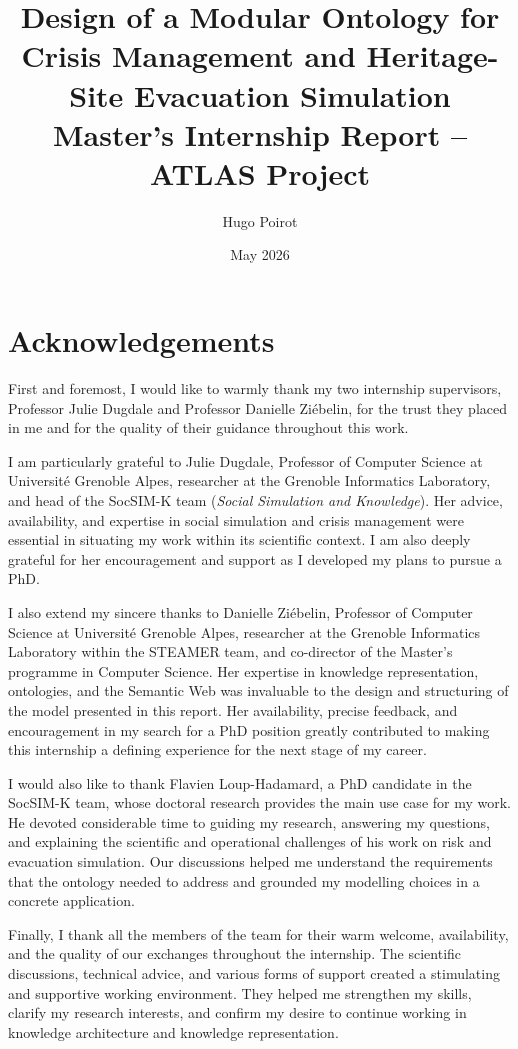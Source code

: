 \documentclass{article}
\title{Design of a Modular Ontology for Crisis Management and Heritage-Site Evacuation Simulation\\[0.4em]
\large Master's Internship Report -- ATLAS Project}
\author{Hugo Poirot}
\date{May 2026}
\begin{document}
\maketitle
\clearpage

\section*{Acknowledgements}

First and foremost, I would like to warmly thank my two internship supervisors, Professor Julie Dugdale and Professor Danielle Ziébelin, for the trust they placed in me and for the quality of their guidance throughout this work.

I am particularly grateful to Julie Dugdale, Professor of Computer Science at Université Grenoble Alpes, researcher at the Grenoble Informatics Laboratory, and head of the SocSIM-K team (\textit{Social Simulation and Knowledge}). Her advice, availability, and expertise in social simulation and crisis management were essential in situating my work within its scientific context. I am also deeply grateful for her encouragement and support as I developed my plans to pursue a PhD.

I also extend my sincere thanks to Danielle Ziébelin, Professor of Computer Science at Université Grenoble Alpes, researcher at the Grenoble Informatics Laboratory within the STEAMER team, and co-director of the Master's programme in Computer Science. Her expertise in knowledge representation, ontologies, and the Semantic Web was invaluable to the design and structuring of the model presented in this report. Her availability, precise feedback, and encouragement in my search for a PhD position greatly contributed to making this internship a defining experience for the next stage of my career.

I would also like to thank Flavien Loup-Hadamard, a PhD candidate in the SocSIM-K team, whose doctoral research provides the main use case for my work. He devoted considerable time to guiding my research, answering my questions, and explaining the scientific and operational challenges of his work on risk and evacuation simulation. Our discussions helped me understand the requirements that the ontology needed to address and grounded my modelling choices in a concrete application.

Finally, I thank all the members of the team for their warm welcome, availability, and the quality of our exchanges throughout the internship. The scientific discussions, technical advice, and various forms of support created a stimulating and supportive working environment. They helped me strengthen my skills, clarify my research interests, and confirm my desire to continue working in knowledge architecture and knowledge representation.
\end{document}
